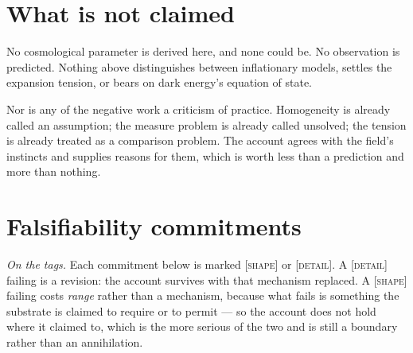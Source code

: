 \documentclass[11pt,a4paper]{article}
\theoremstyle{remark}\newtheorem{remark}[definition]{Remark}
\begin{document}
\section{What is not claimed}\label{sec:not-claimed}
No cosmological parameter is derived here, and none could be. No observation is predicted. Nothing
above distinguishes between inflationary models, settles the expansion tension, or bears on dark energy's
equation of state.

Nor is any of the negative work a criticism of practice. Homogeneity is already called an
assumption; the measure problem is already called unsolved; the tension is already treated as a
comparison problem. The account agrees with the field's instincts and supplies reasons for them,
which is worth less than a prediction and more than nothing.

\section{Falsifiability commitments}\label{sec:falsifiability}

\noindent\emph{On the tags.} Each commitment below is marked \textsc{[shape]} or \textsc{[detail]}.
A \textsc{[detail]} failing is a revision: the account survives with that mechanism replaced. A
\textsc{[shape]} failing costs \emph{range} rather than a mechanism, because what fails is something
the substrate is claimed to require or to permit --- so the account does not hold where it claimed to,
which is the more serious of the two and is still a boundary rather than an annihilation.
\end{document}

